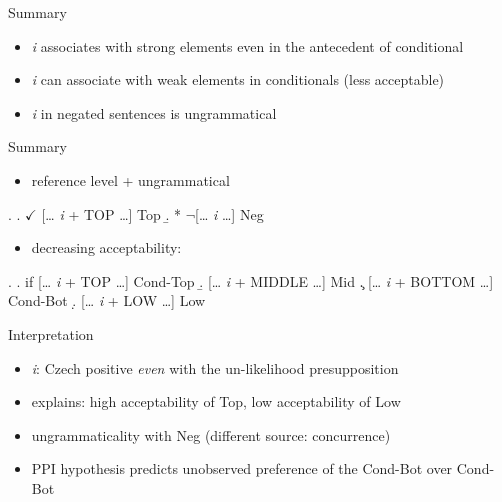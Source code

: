 \documentclass[ignorenonframetext,]{beamer}
\providecommand{\tightlist}{%
  \setlength{\itemsep}{0pt}\setlength{\parskip}{0pt}}
\begin{document}
\begin{frame}{Summary}

\begin{itemize}
\tightlist
\item
  \emph{i} associates with strong elements even in the antecedent of
  conditional
\item
  \emph{i} can associate with weak elements in conditionals (less
  acceptable)
\item
  \emph{i} in negated sentences is ungrammatical
\end{itemize}

\end{frame}

\begin{frame}{Summary}

\begin{itemize}
\tightlist
\item
  reference level + ungrammatical
\end{itemize}

\ex. \a. \(\checkmark\) {[}\ldots{} \emph{i} + TOP \ldots{}{]}
\hfill Top \b. * \(\neg\){[}\ldots{} \emph{i} \ldots{}{]} \hfill Neg

\begin{itemize}
\tightlist
\item
  decreasing acceptability:
\end{itemize}

\ex. \a. if {[}\ldots{} \emph{i} + TOP \ldots{}{]} \hfill Cond-Top \b.
{[}\ldots{} \emph{i} + MIDDLE \ldots{}{]} \hfill Mid \c. {[}\ldots{}
\emph{i} + BOTTOM \ldots{}{]} \hfill Cond-Bot \d. {[}\ldots{} \emph{i} +
LOW \ldots{}{]} \hfill Low

\end{frame}

\begin{frame}{Interpretation}

\begin{itemize}
\tightlist
\item
  \emph{i}: Czech positive \emph{even} with the un-likelihood
  presupposition
\item
  explains: high acceptability of Top, low acceptability of Low
\item
  ungrammaticality with Neg (different source: concurrence)
\item
  PPI hypothesis predicts unobserved preference of the Cond-Bot over
  Cond-Bot
\end{itemize}

\end{frame}
\end{document}
